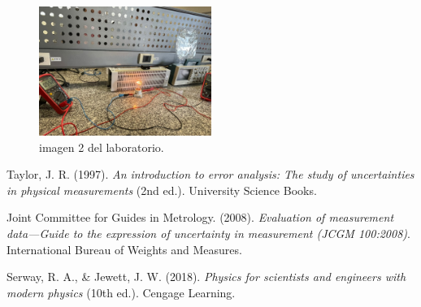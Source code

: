 \documentclass[11pt,twocolumn]{article}
\begin{document}
\begin{figure}[H]
    \centering
    \includegraphics[width=0.5\textwidth]{Anexos/img2.jpg}
    \caption{imagen 2 del laboratorio.}
    \label{fig:lab2}
\end{figure}

\begin{thebibliography}{9}

 Taylor, J. R. (1997). \textit{An introduction to error analysis: The study of uncertainties in physical measurements} (2nd ed.). University Science Books.

 Joint Committee for Guides in Metrology. (2008). \textit{Evaluation of measurement data—Guide to the expression of uncertainty in measurement (JCGM 100:2008)}. International Bureau of Weights and Measures.

 Serway, R. A., \& Jewett, J. W. (2018). \textit{Physics for scientists and engineers with modern physics} (10th ed.). Cengage Learning.



\end{thebibliography}
\end{document}
